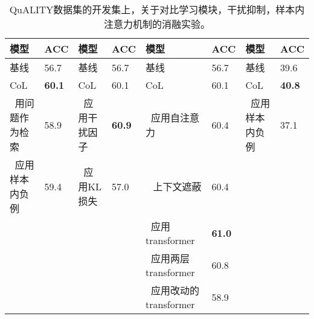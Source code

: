 \begin{table}[htbp]\scriptsize
    \centering
    \begin{tabular}{ll|ll|ll|ll}
    \hline
    {\bfseries 模型} & {\bfseries ACC} & {\bfseries 模型} & {\bfseries ACC} & {\bfseries 模型} & {\bfseries ACC} & {\bfseries 模型} & {\bfseries ACC} \\
    \hline
    基线 & 56.7 & 基线 & 56.7 & 基线 & 56.7 & 基线 & 39.6 \\
    \hline
    CoL & {\bfseries 60.1} & CoL & 60.1 & CoL & 60.1 & CoL & {\bfseries 40.8} \\
    \hline
    $\ $ 用问题作为检索 & 58.9 & $\ $ 应用干扰因子 & {\bfseries 60.9} & $\ $ 应用自注意力 & 60.4 & $\ $ 应用样本内负例 & 37.1 \\
    $\ $ 应用样本内负例 & 59.4 & $\ $ 应用KL损失 & 57.0 & $\ \ $ 上下文遮蔽 & 60.4 & \\
    & & & & $\ $ 应用transformer & {\bfseries 61.0} & & \\
    & & & & $\ $ 应用两层transformer & 60.8 & & \\
    & & & & $\ $ 应用改动的transformer & 58.9 & & \\
    \hline
    \end{tabular}
    \caption{\label{tab:4-4}
    QuALITY数据集的开发集上，关于对比学习模块，干扰抑制，样本内注意力机制的消融实验。
    }
\end{table}
